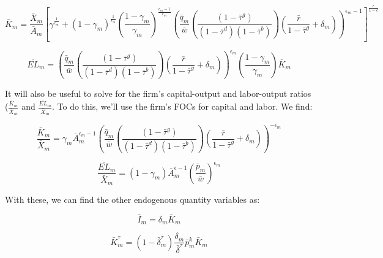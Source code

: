 \documentclass[letterpaper,12pt]{article}
\theoremstyle{definition}
\begin{document}
\begin{spacing}{1.5}
\begin{equation}
\label{eqn:k_demand_tax_ss}
\bar{K}_{m} = \frac{\bar{X}_{m}}{\bar{A}_{m}}\left[\gamma^{\frac{1}{\epsilon_{m}}} + (1-\gamma_{m})^{\frac{1}{\epsilon_{m}}}\left(\frac{1-\gamma_{m}}{\gamma_{m}}\right)^{\frac{\epsilon_{m}-1}{\epsilon_{m}}}\left(\frac{\bar{q}_{m}}{\bar{w}}\left(\frac{(1-\bar{\tau}^{g})}{(1-\bar{\tau}^{d})(1-\bar{\tau}^{b})}\right)\left(\frac{\bar{r}}{1-\bar{\tau}^{g}}+\delta_{m}\right)\right)^{\epsilon_{m}-1} \right]^{\frac{\epsilon}{1-\epsilon}}
\end{equation}

\begin{equation}
\label{eqn:l_demand_tax_ss}
\overline{EL}_{m} = \left(\frac{\bar{q}_{m}}{\bar{w}}\left(\frac{(1-\bar{\tau}^{g})}{(1-\bar{\tau}^{d})(1-\bar{\tau}^{b})}\right)\left(\frac{\bar{r}}{1-\bar{\tau}^{g}}+\delta_{m}\right)\right)^{\epsilon_{m}}\left(\frac{1-\gamma_{m}}{\gamma_{m}}\right)\bar{K}_{m} 
\end{equation}



It will also be useful to solve for the firm's capital-output and labor-output ratios ($\frac{\bar{K}_{m}}{\bar{X}_{m}}$ and $\frac{\overline{EL}_{m}}{\bar{X}_{m}}$.  To do this, we'll use the firm's FOCs for capital and labor.  We find:

\begin{equation}
\label{eqn:k_over_x_tax_ss}
\frac{\bar{K}_{m}}{\bar{X}_{m}} = \gamma_{m}\bar{A}_{m}^{\epsilon_{m}-1} \left(\frac{\bar{q}_{m}}{\bar{w}}\left(\frac{(1-\bar{\tau}^{g})}{(1-\bar{\tau}^{d})(1-\bar{\tau}^{b})}\right)\left(\frac{\bar{r}}{1-\bar{\tau}^{g}}+\delta_{m}\right)\right)^{-\epsilon_{m}}
\end{equation}

\begin{equation}
\label{eqn:l_over_x_tax_ss}
\frac{\overline{EL}_{m}}{\bar{X}_{m}} = (1-\gamma_{m})\bar{A}_{m}^{\epsilon-1}\left(\frac{\bar{p}_{m}}{\bar{w}}\right)^{\epsilon_{m}}
\end{equation}

With these, we can find the other endogenous quantity variables as:

\begin{equation}
\bar{I}_{m} = \delta_{m}\bar{K}_{m} 
\end{equation}

\begin{equation}
\bar{K}^{\tau}_{m} = (1-\bar{\delta}^{\tau}_{m})\frac{\delta_{m}}{\bar{\delta}^{\tau}}\bar{p}^{k}_{m}\bar{K}_{m} 
\end{equation}


\end{spacing}
\end{document}
